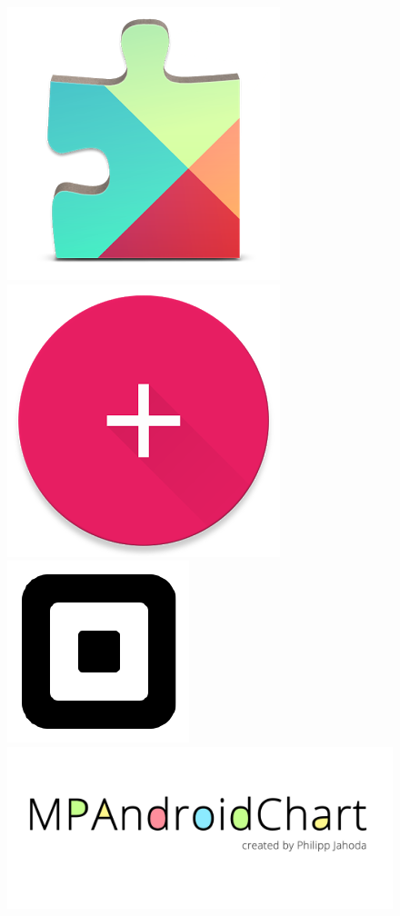 \\\\
\begin{figure}[H]
\centering
\includegraphics[scale=0.20]{Figures/googleplayservices.png}
\includegraphics[scale=0.20]{Figures/floatingactionbutton.png}
\includegraphics[scale=0.25]{Figures/square.png}
\includegraphics[scale=0.075]{Figures/mpandroidchart.png}

\end{figure}
